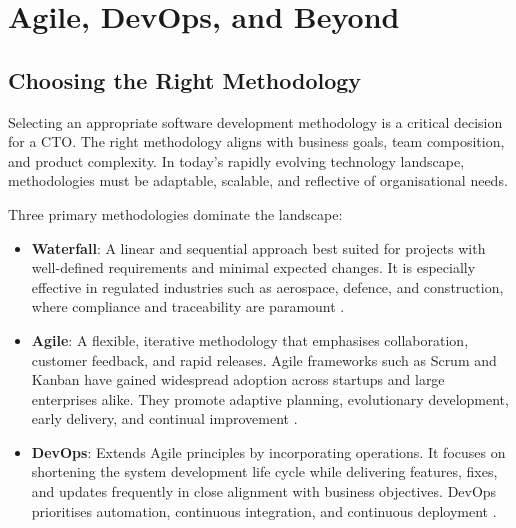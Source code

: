 \section{Agile, DevOps, and Beyond}

\subsection{Choosing the Right Methodology}
Selecting an appropriate software development methodology is a critical decision for a CTO. The right methodology aligns with business goals, team composition, and product complexity. In today's rapidly evolving technology landscape, methodologies must be adaptable, scalable, and reflective of organisational needs.

Three primary methodologies dominate the landscape:

\begin{itemize}
    \item \textbf{Waterfall}: A linear and sequential approach best suited for projects with well-defined requirements and minimal expected changes. It is especially effective in regulated industries such as aerospace, defence, and construction, where compliance and traceability are paramount \cite{royce1970waterfall}.

    \item \textbf{Agile}: A flexible, iterative methodology that emphasises collaboration, customer feedback, and rapid releases. Agile frameworks such as Scrum and Kanban have gained widespread adoption across startups and large enterprises alike. They promote adaptive planning, evolutionary development, early delivery, and continual improvement \cite{beck2001agile}.

    \item \textbf{DevOps}: Extends Agile principles by incorporating operations. It focuses on shortening the system development life cycle while delivering features, fixes, and updates frequently in close alignment with business objectives. DevOps prioritises automation, continuous integration, and continuous deployment \cite{kim2016phoenix}.
\end{itemize}

